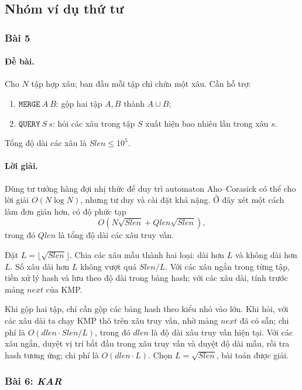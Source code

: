\documentclass[11pt]{article}
\begin{document}
\subsection{Nhóm ví dụ thứ tư}

\subsubsection{Bài 5}

\paragraph{Đề bài.}
Cho \(N\) tập hợp xâu; ban đầu mỗi tập chỉ chứa một xâu. Cần hỗ trợ:
\begin{enumerate}
  \item \(\texttt{MERGE}\ A\ B\): gộp hai tập \(A,B\) thành \(A\cup B\);
  \item \(\texttt{QUERY}\ S\ s\): hỏi các xâu trong tập \(S\) xuất hiện bao
  nhiêu lần trong xâu \(s\).
\end{enumerate}
Tổng độ dài các xâu là \(\mathit{Slen}\le 10^5\).

\paragraph{Lời giải.}
Dùng tư tưởng hàng đợi nhị thức để duy trì automaton Aho--Corasick có thể cho
lời giải \(O(N\log N)\), nhưng tư duy và cài đặt khá nặng. Ở đây xét một cách
làm đơn giản hơn, có độ phức tạp
\[
  O(N\sqrt{\mathit{Slen}}+Qlen\sqrt{\mathit{Slen}}),
\]
trong đó \(Qlen\) là tổng độ dài các xâu truy vấn.

Đặt \(L=\lfloor\sqrt{\mathit{Slen}}\rfloor\). Chia các xâu mẫu thành hai loại:
dài hơn \(L\) và không dài hơn \(L\). Số xâu dài hơn \(L\) không vượt quá
\(\mathit{Slen}/L\). Với các xâu ngắn trong từng tập, tiền xử lý hash và lưu
theo độ dài trong bảng hash; với các xâu dài, tính trước mảng \(\mathit{next}\)
của KMP.

Khi gộp hai tập, chỉ cần gộp các bảng hash theo kiểu nhỏ vào lớn. Khi hỏi, với
các xâu dài ta chạy KMP thô trên xâu truy vấn, nhờ mảng \(\mathit{next}\) đã
có sẵn; chi phí là \(O(dlen\cdot \mathit{Slen}/L)\), trong đó \(dlen\) là độ
dài xâu truy vấn hiện tại. Với các xâu ngắn, duyệt vị trí bắt đầu trong xâu
truy vấn và duyệt độ dài mẫu, rồi tra hash tương ứng; chi phí là
\(O(dlen\cdot L)\). Chọn \(L=\sqrt{\mathit{Slen}}\), bài toán được giải.

\subsubsection{Bài 6: \emph{KAR}}
\end{document}
